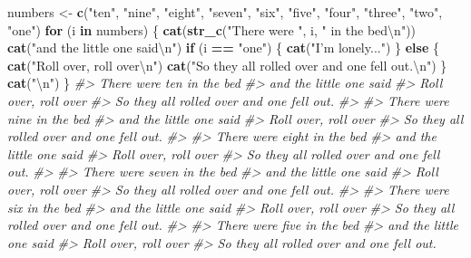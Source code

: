 \documentclass[]{book}
\newenvironment{Shaded}{\begin{snugshade}}{\end{snugshade}}
\newcommand{\CharTok}[1]{\textcolor[rgb]{0.31,0.60,0.02}{#1}}
\newcommand{\CommentTok}[1]{\textcolor[rgb]{0.56,0.35,0.01}{\textit{#1}}}
\newcommand{\ControlFlowTok}[1]{\textcolor[rgb]{0.13,0.29,0.53}{\textbf{#1}}}
\newcommand{\KeywordTok}[1]{\textcolor[rgb]{0.13,0.29,0.53}{\textbf{#1}}}
\newcommand{\NormalTok}[1]{#1}
\newcommand{\OperatorTok}[1]{\textcolor[rgb]{0.81,0.36,0.00}{\textbf{#1}}}
\newcommand{\StringTok}[1]{\textcolor[rgb]{0.31,0.60,0.02}{#1}}
\theoremstyle{plain}
\theoremstyle{remark}
\begin{document}
\begin{enumerate}
\begin{Shaded}
\begin{Highlighting}[]
\NormalTok{numbers <-}\StringTok{ }\KeywordTok{c}\NormalTok{(}\StringTok{"ten"}\NormalTok{, }\StringTok{"nine"}\NormalTok{, }\StringTok{"eight"}\NormalTok{, }\StringTok{"seven"}\NormalTok{, }\StringTok{"six"}\NormalTok{, }\StringTok{"five"}\NormalTok{,}
             \StringTok{"four"}\NormalTok{, }\StringTok{"three"}\NormalTok{, }\StringTok{"two"}\NormalTok{, }\StringTok{"one"}\NormalTok{)}
\ControlFlowTok{for}\NormalTok{ (i }\ControlFlowTok{in}\NormalTok{ numbers) \{}
  \KeywordTok{cat}\NormalTok{(}\KeywordTok{str_c}\NormalTok{(}\StringTok{"There were "}\NormalTok{, i, }\StringTok{" in the bed}\CharTok{\textbackslash{}n}\StringTok{"}\NormalTok{))}
  \KeywordTok{cat}\NormalTok{(}\StringTok{"and the little one said}\CharTok{\textbackslash{}n}\StringTok{"}\NormalTok{)}
  \ControlFlowTok{if}\NormalTok{ (i }\OperatorTok{==}\StringTok{ "one"}\NormalTok{) \{}
    \KeywordTok{cat}\NormalTok{(}\StringTok{"I'm lonely..."}\NormalTok{)}
\NormalTok{  \} }\ControlFlowTok{else}\NormalTok{ \{}
    \KeywordTok{cat}\NormalTok{(}\StringTok{"Roll over, roll over}\CharTok{\textbackslash{}n}\StringTok{"}\NormalTok{)}
    \KeywordTok{cat}\NormalTok{(}\StringTok{"So they all rolled over and one fell out.}\CharTok{\textbackslash{}n}\StringTok{"}\NormalTok{)}
\NormalTok{  \}}
  \KeywordTok{cat}\NormalTok{(}\StringTok{"}\CharTok{\textbackslash{}n}\StringTok{"}\NormalTok{)}
\NormalTok{\}}
\CommentTok{#> There were ten in the bed}
\CommentTok{#> and the little one said}
\CommentTok{#> Roll over, roll over}
\CommentTok{#> So they all rolled over and one fell out.}
\CommentTok{#> }
\CommentTok{#> There were nine in the bed}
\CommentTok{#> and the little one said}
\CommentTok{#> Roll over, roll over}
\CommentTok{#> So they all rolled over and one fell out.}
\CommentTok{#> }
\CommentTok{#> There were eight in the bed}
\CommentTok{#> and the little one said}
\CommentTok{#> Roll over, roll over}
\CommentTok{#> So they all rolled over and one fell out.}
\CommentTok{#> }
\CommentTok{#> There were seven in the bed}
\CommentTok{#> and the little one said}
\CommentTok{#> Roll over, roll over}
\CommentTok{#> So they all rolled over and one fell out.}
\CommentTok{#> }
\CommentTok{#> There were six in the bed}
\CommentTok{#> and the little one said}
\CommentTok{#> Roll over, roll over}
\CommentTok{#> So they all rolled over and one fell out.}
\CommentTok{#> }
\CommentTok{#> There were five in the bed}
\CommentTok{#> and the little one said}
\CommentTok{#> Roll over, roll over}
\CommentTok{#> So they all rolled over and one fell out.}

\end{Highlighting}
\end{Shaded}
\end{enumerate}
\end{document}
